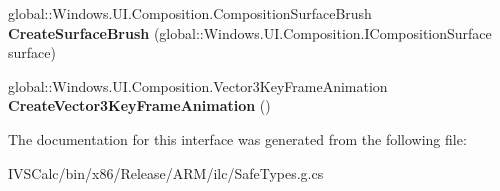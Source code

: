 \begin{DoxyCompactItemize}
\item 
\mbox{\label{interface_windows_1_1_u_i_1_1_composition_1_1_i_compositor_a9dce8b6100f7776e8c934df2a289924e}} 
global\+::\+Windows.\+U\+I.\+Composition.\+Composition\+Surface\+Brush {\bfseries Create\+Surface\+Brush} (global\+::\+Windows.\+U\+I.\+Composition.\+I\+Composition\+Surface surface)
\item 
\mbox{\label{interface_windows_1_1_u_i_1_1_composition_1_1_i_compositor_a7cda6336654224115f835339f7968fb1}} 
global\+::\+Windows.\+U\+I.\+Composition.\+Vector3\+Key\+Frame\+Animation {\bfseries Create\+Vector3\+Key\+Frame\+Animation} ()
\end{DoxyCompactItemize}


The documentation for this interface was generated from the following file\+:\begin{DoxyCompactItemize}
\item 
I\+V\+S\+Calc/bin/x86/\+Release/\+A\+R\+M/ilc/Safe\+Types.\+g.\+cs\end{DoxyCompactItemize}

